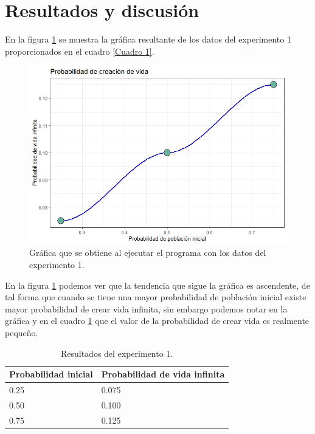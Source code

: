 \documentclass{article}
\begin{document}
\section{Resultados y discusión}

En la figura \ref{Figura1} se muestra la gráfica resultante de los datos del experimento 1 proporcionados en el cuadro \ref{Cuadro 1}. 

\begin{figure} [h!]%
    \centering
    \includegraphics[width=150mm]{Figura1.jpeg} %
    \caption{Gráfica que se obtiene al ejecutar el programa con los datos del experimento 1.}
    \label{Figura1}
\end{figure}

En la figura \ref{Figura1} podemos ver que la tendencia que sigue la gráfica es ascendente, de tal forma que cuando se tiene una mayor probabilidad de población inicial existe mayor probabilidad de crear vida infinita, sin embargo podemos notar en la gráfica y en el cuadro \ref{Cuadro 2} que el valor de la probabilidad de crear vida es realmente pequeño. 

\begin{table}[ht]
\centering
\begin{tabular}{ |p{3cm}||p{5cm}|}
 \hline
 Probabilidad inicial & Probabilidad de vida infinita\\
 \hline
 0.25 & 0.075 \\
 \hline
 0.50 & 0.100 \\
 \hline
 0.75 & 0.125 \\
 \hline
\end{tabular}
\caption{Resultados del experimento 1.}
\label{Cuadro 2}
\end{table}
\end{document}
